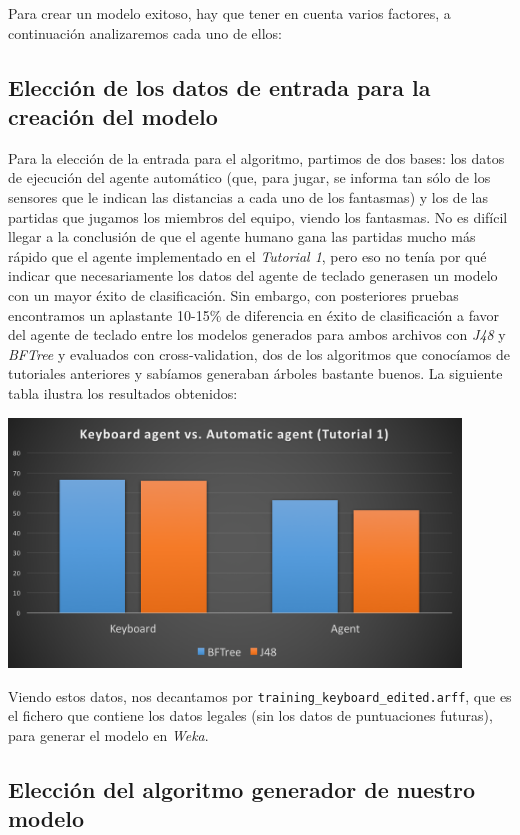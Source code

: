 \documentclass[12pt]{article}
\begin{document}
Para crear un modelo exitoso, hay que tener en cuenta varios factores, a continuación analizaremos cada uno de ellos:

\subsection{Elección de los datos de entrada para la creación del modelo}

Para la elección de la entrada para el algoritmo, partimos de dos bases: los datos de ejecución del agente automático (que, para jugar, se informa tan sólo de los sensores que le indican las distancias a cada uno de los fantasmas) y los de las partidas que jugamos los miembros del equipo, viendo los fantasmas. No es difícil llegar a la conclusión de que el agente humano gana las partidas mucho más rápido que el agente implementado en el \emph{Tutorial 1}, pero eso no tenía por qué indicar que necesariamente los datos del agente de teclado generasen un modelo con un mayor éxito de clasificación. Sin embargo, con posteriores pruebas encontramos un aplastante 10-15\% de diferencia en éxito de clasificación a favor del agente de teclado entre los modelos generados para ambos archivos con \emph{J48} y \emph{BFTree} y evaluados con cross-validation, dos de los algoritmos que conocíamos de tutoriales anteriores y sabíamos generaban árboles bastante buenos. La siguiente tabla ilustra los resultados obtenidos:

\begin{center} \includegraphics[width=12cm]{kb_vs_aa} \end{center}

Viendo estos datos, nos decantamos por \texttt{training\_keyboard\_edited.arff}, que es el fichero que contiene los datos legales (sin los datos de puntuaciones futuras), para generar el modelo en \emph{Weka}.

\newpage
\subsection{Elección del algoritmo generador de nuestro modelo}
\end{document}
